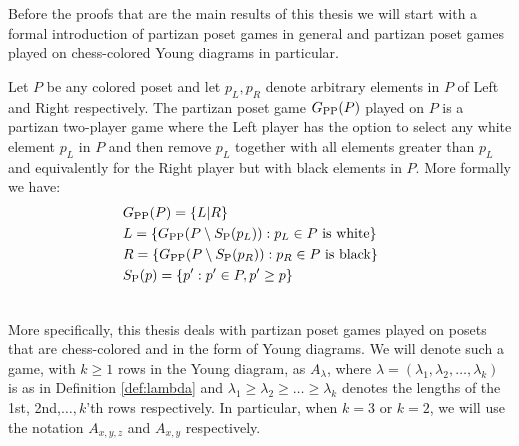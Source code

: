 Before the proofs that are the main results of this thesis we will start with a formal introduction of partizan poset games in general and partizan poset games played on chess-colored Young diagrams in particular.
\begin{defn}
Let $P$ be any colored poset and let $p_L,p_R$ denote arbitrary elements in $P$ of Left and Right respectively. The partizan poset game $G_{\rm PP}(P)$ played on $P$ is a partizan two-player game where the Left player has the option to select any white element $p_L$ in $P$ and then remove $p_L$ together with all elements greater than $p_L$ and equivalently for the Right player but with black elements in $P$. More formally we have:
\begin{align*}
&G_{\rm PP}(P)=\{L|R\}&~\\
&L=\{G_{\rm PP}(P\setminus S_{\rm P}(p_L)):p_L\in P\text{ is white}\}&~\\
&R=\{G_{\rm PP}(P\setminus S_{\rm P}(p_R)):p_R\in P\text{ is black}\}&\\
&S_{\rm P}(p)=\{p':p'\in P,p'\ge p\}&~
\end{align*}
\end{defn}
~\\
More specifically, this thesis deals with partizan poset games played on posets that are chess-colored and in the form of Young diagrams. We will denote such a game, with $k\ge1$ rows in the Young diagram, as $A_\lambda$, where $\lambda=(\lambda_1,\lambda_2,\dots,\lambda_k)$ is as in Definition \ref{def:lambda} and $\lambda_1\ge \lambda_2\ge \dots\ge \lambda_k$ denotes the lengths of the 1st, 2nd,$\dots,k$'th rows respectively. In particular, when $k=3$ or $k=2$, we will use the notation $A_{x,y,z}$ and $A_{x,y}$ respectively.


